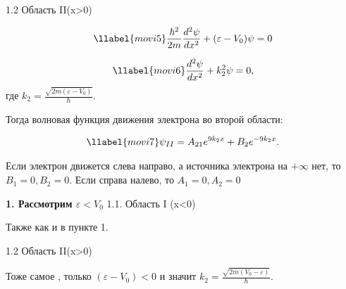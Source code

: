 1.2 Область II(x>0)


\begin{gather}
\llabel{movi5}
\frac{\hbar^{2}}{2m}\frac{d^{2}\psi}{dx^{2}}+(\varepsilon-V_{0})\psi=0
\end{gather}

\begin{gather}
\llabel{movi6}
\frac{d^{2}\psi}{dx^{2}}+k_{2}^{2}\psi=0,
\end{gather}
где $k_{2}=\frac{\sqrt{2m(\varepsilon-V_{0})}}{\hbar}$.

Тогда волновая функция движения электрона во второй  области:

\begin{gather}
\llabel{movi7}
\psi_{II}=A_{21}e^{9k_{2}x}+B_{2}e^{-9k_{2}x}.
\end{gather}

Если электрон движется слева направо, а источника электрона на $+\infty$ нет, то $B_{1}=0, B_{2}=0$. Если справа налево, то  $A_{1}=0, A_{2}=0$

\textbf{1. Рассмотрим  $\varepsilon<V_{0}$ }
1.1. Область I (x<0)

Также как и в пункте 1.


1.2 Область II(x>0)

Тоже самое , только $(\varepsilon-V_{0})<0$ и значит  $k_{2}=\frac{\sqrt{2m(V_{0}-\varepsilon)}}{\hbar}$.

